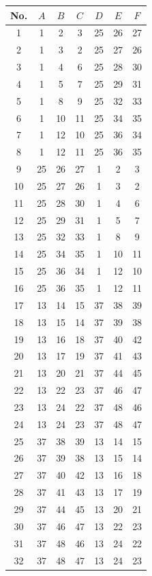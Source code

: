 \begin{tabular}{ccccccc}
\toprule
No. & $A$ & $B$ & $C$ & $D$ & $E$ & $F$ \\
\midrule
1  & 1  & 2  & 3  & 25 & 26 & 27 \\
2  & 1  & 3  & 2  & 25 & 27 & 26 \\
3  & 1  & 4  & 6  & 25 & 28 & 30 \\
4  & 1  & 5  & 7  & 25 & 29 & 31 \\
5  & 1  & 8  & 9  & 25 & 32 & 33 \\
6  & 1  & 10 & 11 & 25 & 34 & 35 \\
7  & 1  & 12 & 10 & 25 & 36 & 34 \\
8  & 1  & 12 & 11 & 25 & 36 & 35 \\
9  & 25 & 26 & 27 & 1  & 2  & 3  \\
10 & 25 & 27 & 26 & 1  & 3  & 2  \\
11 & 25 & 28 & 30 & 1  & 4  & 6  \\
12 & 25 & 29 & 31 & 1  & 5  & 7  \\
13 & 25 & 32 & 33 & 1  & 8  & 9  \\
14 & 25 & 34 & 35 & 1  & 10 & 11 \\
15 & 25 & 36 & 34 & 1  & 12 & 10 \\
16 & 25 & 36 & 35 & 1  & 12 & 11 \\
17 & 13 & 14 & 15 & 37 & 38 & 39 \\
18 & 13 & 15 & 14 & 37 & 39 & 38 \\
19 & 13 & 16 & 18 & 37 & 40 & 42 \\
20 & 13 & 17 & 19 & 37 & 41 & 43 \\
21 & 13 & 20 & 21 & 37 & 44 & 45 \\
22 & 13 & 22 & 23 & 37 & 46 & 47 \\
23 & 13 & 24 & 22 & 37 & 48 & 46 \\
24 & 13 & 24 & 23 & 37 & 48 & 47 \\
25 & 37 & 38 & 39 & 13 & 14 & 15 \\
26 & 37 & 39 & 38 & 13 & 15 & 14 \\
27 & 37 & 40 & 42 & 13 & 16 & 18 \\
28 & 37 & 41 & 43 & 13 & 17 & 19 \\
29 & 37 & 44 & 45 & 13 & 20 & 21 \\
30 & 37 & 46 & 47 & 13 & 22 & 23 \\
31 & 37 & 48 & 46 & 13 & 24 & 22 \\
32 & 37 & 48 & 47 & 13 & 24 & 23 \\
\bottomrule
\end{tabular}
